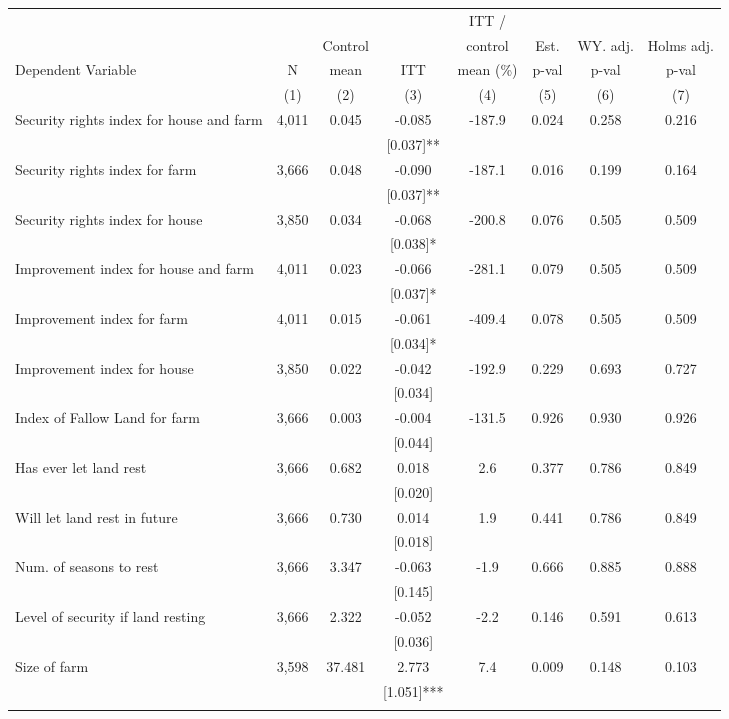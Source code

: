 \begin{tabular}{lccccccc}
\hline \noalign{\smallskip} &  &  &  & ITT / &  &  & \\
 &  & Control &  & control & Est. & WY. adj. & Holms adj.\\
Dependent Variable & N & mean & ITT & mean (\%) & p-val & p-val & p-val\\
 & (1) & (2) & (3) & (4) & (5) & (6) & (7)\\
\noalign{\smallskip}\hline \noalign{\smallskip}Security rights index for house and farm & 4,011 & 0.045 & -0.085 & -187.9 & 0.024 & 0.258 & 0.216\\
 &  &  & [0.037]** &  &  &  & \\
\quad Security rights index for farm & 3,666 & 0.048 & -0.090 & -187.1 & 0.016 & 0.199 & 0.164\\
 &  &  & [0.037]** &  &  &  & \\
\quad Security rights index for house & 3,850 & 0.034 & -0.068 & -200.8 & 0.076 & 0.505 & 0.509\\
 &  &  & [0.038]* &  &  &  & \\
Improvement index for house and farm & 4,011 & 0.023 & -0.066 & -281.1 & 0.079 & 0.505 & 0.509\\
 &  &  & [0.037]* &  &  &  & \\
\quad Improvement index for farm & 4,011 & 0.015 & -0.061 & -409.4 & 0.078 & 0.505 & 0.509\\
 &  &  & [0.034]* &  &  &  & \\
\quad Improvement index for house & 3,850 & 0.022 & -0.042 & -192.9 & 0.229 & 0.693 & 0.727\\
 &  &  & [0.034] &  &  &  & \\
Index of Fallow Land for farm & 3,666 & 0.003 & -0.004 & -131.5 & 0.926 & 0.930 & 0.926\\
 &  &  & [0.044] &  &  &  & \\
\quad Has ever let land rest & 3,666 & 0.682 & 0.018 & 2.6 & 0.377 & 0.786 & 0.849\\
 &  &  & [0.020] &  &  &  & \\
\quad Will let land rest in future & 3,666 & 0.730 & 0.014 & 1.9 & 0.441 & 0.786 & 0.849\\
 &  &  & [0.018] &  &  &  & \\
\quad Num. of seasons to rest & 3,666 & 3.347 & -0.063 & -1.9 & 0.666 & 0.885 & 0.888\\
 &  &  & [0.145] &  &  &  & \\
\quad Level of security if land resting & 3,666 & 2.322 & -0.052 & -2.2 & 0.146 & 0.591 & 0.613\\
 &  &  & [0.036] &  &  &  & \\
Size of farm & 3,598 & 37.481 & 2.773 & 7.4 & 0.009 & 0.148 & 0.103\\
 &  &  & [1.051]*** &  &  &  & \\
\noalign{\smallskip}\hline\end{tabular}
